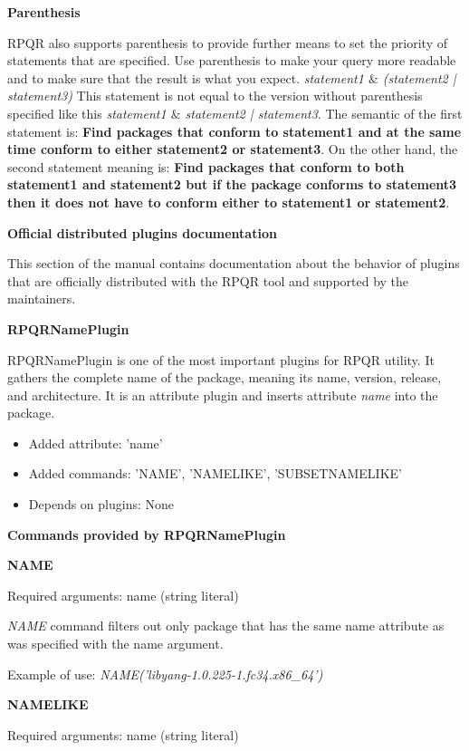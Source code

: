 \textbf{Parenthesis}

RPQR also supports parenthesis to provide further means to set the priority of statements that are specified.
Use parenthesis to make your query more readable and to make sure that the result is what you expect.
\textit{statement1 $\&$ (statement2 | statement3)} This statement is not equal to the version without
parenthesis specified like this \textit{statement1 $\&$ statement2 | statement3}. The semantic of the first
statement is: \textbf{Find packages that conform to statement1 and at the same time conform to either
statement2 or statement3}. On the other hand, the second statement meaning is: \textbf{Find packages
that conform to both statement1 and statement2 but if the package conforms to statement3 then it does not
have to conform either to statement1 or statement2}.

\newpage

\textbf{Official distributed plugins documentation}

This section of the manual contains documentation about the behavior of plugins that are officially
distributed with the RPQR tool and supported by the maintainers.

\textbf{RPQRNamePlugin}

RPQRNamePlugin is one of the most important plugins for RPQR utility. It gathers the complete name of the
package, meaning its name, version, release, and architecture. It is an attribute plugin and inserts
attribute \textit{name} into the package.

\begin{itemize}
  \item Added attribute: 'name'
  \item Added commands: 'NAME', 'NAMELIKE', 'SUBSETNAMELIKE'
  \item Depends on plugins: None
\end{itemize}

\textbf{Commands provided by RPQRNamePlugin}

\textbf{NAME}

Required arguments: name (string literal)

\textit{NAME} command filters out only package that has the same name attribute as was specified
with the name argument.

Example of use: \textit{NAME('libyang-1.0.225-1.fc34.x86\_64')}

\textbf{NAMELIKE}

Required arguments: name (string literal)

